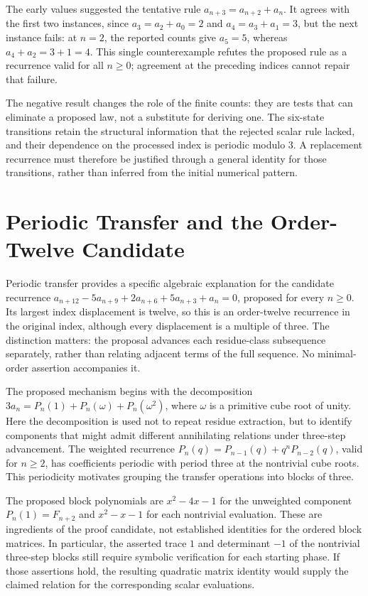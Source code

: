 \documentclass[11pt]{article}
\begin{document}
The early values suggested the tentative rule $a_{n+3}=a_{n+2}+a_n$. It agrees with the first two instances, since $a_3=a_2+a_0=2$ and $a_4=a_3+a_1=3$, but the next instance fails: at $n=2$, the reported counts give $a_5=5$, whereas $a_4+a_2=3+1=4$. This single counterexample refutes the proposed rule as a recurrence valid for all $n\geq0$; agreement at the preceding indices cannot repair that failure.

The negative result changes the role of the finite counts: they are tests that can eliminate a proposed law, not a substitute for deriving one. The six-state transitions retain the structural information that the rejected scalar rule lacked, and their dependence on the processed index is periodic modulo $3$. A replacement recurrence must therefore be justified through a general identity for those transitions, rather than inferred from the initial numerical pattern.

\section{Periodic Transfer and the Order-Twelve Candidate}
Periodic transfer provides a specific algebraic explanation for the candidate recurrence $a_{n+12}-5a_{n+9}+2a_{n+6}+5a_{n+3}+a_n=0$, proposed for every $n\geq 0$. Its largest index displacement is twelve, so this is an order-twelve recurrence in the original index, although every displacement is a multiple of three. The distinction matters: the proposal advances each residue-class subsequence separately, rather than relating adjacent terms of the full sequence. No minimal-order assertion accompanies it.

The proposed mechanism begins with the decomposition $3a_n=P_n(1)+P_n(\omega)+P_n(\omega^2)$, where $\omega$ is a primitive cube root of unity. Here the decomposition is used not to repeat residue extraction, but to identify components that might admit different annihilating relations under three-step advancement. The weighted recurrence $P_n(q)=P_{n-1}(q)+q^nP_{n-2}(q)$, valid for $n\geq 2$, has coefficients periodic with period three at the nontrivial cube roots. This periodicity motivates grouping the transfer operations into blocks of three.

The proposed block polynomials are $x^2-4x-1$ for the unweighted component $P_n(1)=F_{n+2}$ and $x^2-x-1$ for each nontrivial evaluation. These are ingredients of the proof candidate, not established identities for the ordered block matrices. In particular, the asserted trace $1$ and determinant $-1$ of the nontrivial three-step blocks still require symbolic verification for each starting phase. If those assertions hold, the resulting quadratic matrix identity would supply the claimed relation for the corresponding scalar evaluations.
\end{document}
